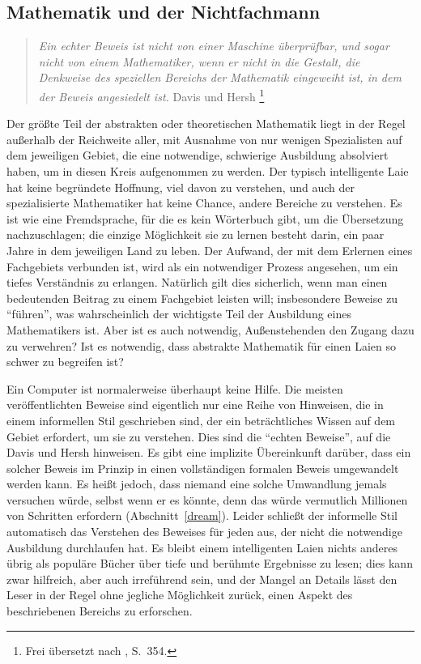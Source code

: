 \subsection{Mathematik und der Nichtfachmann}

\begin{quote}
  {\em Ein echter Beweis ist nicht von einer Maschine überprüfbar, und sogar nicht von einem Mathematiker, wenn er nicht in die Gestalt, die Denkweise des speziellen Bereichs der Mathematik eingeweiht ist, in dem der Beweis angesiedelt ist.}
  \flushright\sc  Davis und Hersh
  \footnote{Frei übersetzt nach \cite{Davis}, S.~354.}\\
\end{quote}

Der größte Teil der abstrakten oder theoretischen Mathematik liegt in der Regel außerhalb der Reichweite aller, mit Ausnahme von nur wenigen Spezialisten auf dem jeweiligen Gebiet, die eine notwendige, schwierige Ausbildung absolviert haben, um in diesen Kreis aufgenommen zu werden.  Der typisch intelligente Laie hat keine begründete Hoffnung, viel davon zu verstehen, und auch der spezialisierte Mathematiker hat keine Chance, andere Bereiche zu verstehen.
Es ist wie eine Fremdsprache, für die es kein Wörterbuch gibt, um die Übersetzung nachzuschlagen; die einzige Möglichkeit sie zu lernen besteht darin, ein paar Jahre in dem jeweiligen Land zu leben.
Der Aufwand, der mit dem Erlernen eines Fachgebiets verbunden ist, wird als ein notwendiger Prozess angesehen, um ein tiefes Verständnis zu erlangen.  Natürlich gilt dies sicherlich, wenn man einen bedeutenden Beitrag zu einem Fachgebiet leisten will; insbesondere Beweise zu "`führen"', was wahrscheinlich der wichtigste Teil der Ausbildung eines Mathematikers ist.  Aber ist es auch notwendig, Außenstehenden den Zugang dazu zu verwehren?  Ist es notwendig, dass abstrakte Mathematik für einen Laien so schwer zu begreifen ist?

Ein Computer ist normalerweise überhaupt keine Hilfe.  Die meisten veröffentlichten Beweise sind eigentlich nur eine Reihe von Hinweisen, die in einem informellen Stil geschrieben sind, der ein beträchtliches Wissen auf dem Gebiet erfordert, um sie zu verstehen.  Dies sind die "`echten Beweise"', auf die Davis und Hersh hinweisen. Es gibt eine implizite Übereinkunft darüber, dass ein solcher Beweis im Prinzip in einen vollständigen formalen Beweis umgewandelt werden kann.
Es heißt jedoch, dass niemand eine solche Umwandlung jemals versuchen würde, selbst wenn er es könnte, denn das würde vermutlich Millionen von Schritten erfordern (Abschnitt~\ref{dream}).  Leider schließt der informelle Stil automatisch das Verstehen des Beweises für jeden aus, der nicht die notwendige Ausbildung durchlaufen hat.  Es bleibt einem intelligenten Laien nichts anderes übrig als populäre Bücher über tiefe und berühmte Ergebnisse zu lesen; dies kann zwar hilfreich, aber auch irreführend sein, und der Mangel an Details lässt den Leser in der Regel ohne jegliche Möglichkeit zurück, einen Aspekt des beschriebenen Bereichs zu erforschen.

